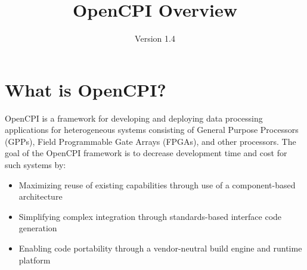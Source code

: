 \def\docTitle{OpenCPI Overview}
\def\docVersion{1.4}

\setlength{\parindent}{0pt} %
\newcommand{\forceindent}{\leavevmode{\parindent=1em\indent}}
\date{Version \docVersion} %
\title{\docTitle}
\lhead{\small {\docTitle} }
\def\bstart{~\\
\begin{minipage}{\linewidth}}
\def\bend{\end{minipage}
~\\
}

\section*{What is OpenCPI?}
\label{sec:what_is_opencpi}
OpenCPI is a framework for developing and deploying data processing applications for heterogeneous systems consisting of General Purpose Processors (GPPs), Field Programmable Gate Arrays (FPGAs), and other processors. The goal of the OpenCPI framework is to decrease development time and cost for such systems by:
\begin{itemize}
\item Maximizing reuse of existing capabilities through use of a component-based architecture
\item Simplifying complex integration through standards-based interface code generation
\item Enabling code portability through a vendor-neutral build engine and runtime platform
\end{itemize}

